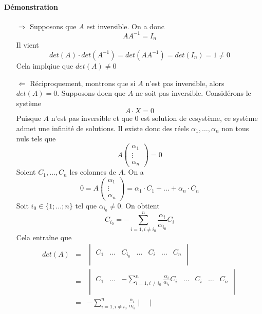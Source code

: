 \paragraph{Démonstration} 
\begin{itemize}
  \item [$\Rightarrow$] Supposons que $A$ est inversible. On a donc
    $$A A^{-1} = I_n$$
    Il vient
    $$det(A) \cdot det(A^{-1}) = det(AA^{-1}) = det(I_n) = 1 \neq 0$$
    Cela implqiue que $det(A) \neq 0$
  
  \item [$\Leftarrow$] Réciproquement, montrons que si $A$ n'est pas inversible, alors $det(A) = 0$. Supposons docn que $A$ ne soit pas inversible. Considérons le système 
    $$A \cdot X = 0$$
    Puisque $A$ n'est pas inversible et que $0$ est solution de cesystème, ce système admet une infinité de solutions. Il existe donc des réels $\alpha_1, \ldots, \alpha_n$ non tous nuls tels que
    $$A \begin{pmatrix} \alpha_1 \\ \vdots \\ \alpha_n \end{pmatrix} = 0$$
    Soient $C_1, \ldots, C_n$ les colonnes de $A$. On a 
    $$0 = A \begin{pmatrix} \alpha_1 \\ \vdots \\ \alpha_n \end{pmatrix} = \alpha_1 \cdot C_1 + \ldots + \alpha_n \cdot C_n$$
    Soit $i_0 \in \{1; \ldots; n \}$ tel que $\alpha_{i_0} \neq 0$. On obtient 
    $$C_{i_0} = - \sum_{i=1, i\neq i_0}^n \frac{\alpha_i}{\alpha_{i_0}} C_i$$
    Cela entraîne que
    \begin{eqnarray*}
      det(A) &=& \begin{vmatrix} \\
        C_1 & \ldots & C_{i_0} & \ldots & C_i & \ldots & C_n 
      \\ \\ \end{vmatrix} \\
        &=& \begin{vmatrix} \\
          C_1 & \ldots & - \sum_{i=1, i\neq i_0}^n \frac{\alpha_i}{\alpha_{i_0}} C_i & \ldots & C_i & \ldots & C_n 
        \\ \\\end{vmatrix} \\
        &=& - \sum_{i=1, i\neq i_0}^n \frac{\alpha_i}{\alpha_{i_0}} \begin{vmatrix} \\

\end{vmatrix}
\end{eqnarray*}
\end{itemize}
